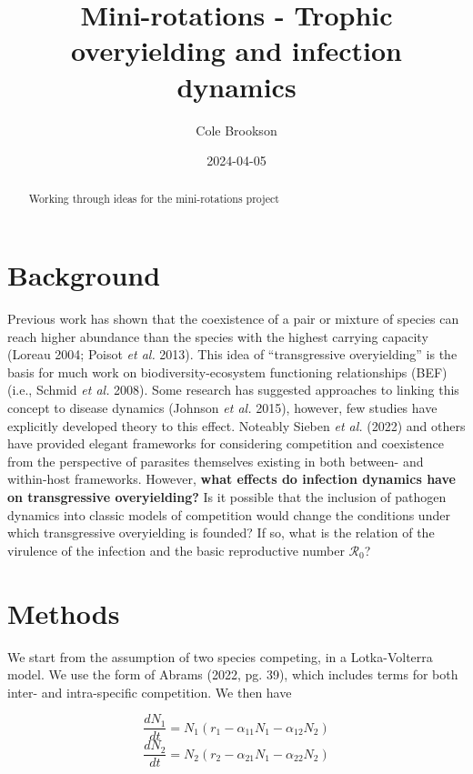 \documentclass[
  letterpaper,
  DIV=11,
  numbers=noendperiod]{scrartcl}
\title{Mini-rotations - Trophic overyielding and infection dynamics}
\author{Cole Brookson}
\date{2024-04-05}
\renewcommand*\contentsname{Table of contents}
\newcommand\contentsname{Table of contents}
\begin{document}
\maketitle
\begin{abstract}
Working through ideas for the mini-rotations project
\end{abstract}

\renewcommand*\contentsname{Table of contents}
{
\hypersetup{linkcolor=}
\setcounter{tocdepth}{3}
\tableofcontents
}
\section{Background}

Previous work has shown that the coexistence of a pair or mixture of
species can reach higher abundance than the species with the highest
carrying capacity (Loreau 2004; Poisot \emph{et al.} 2013). This idea of
``transgressive overyielding'' is the basis for much work on
biodiversity-ecosystem functioning relationships (BEF) (i.e., Schmid
\emph{et al.} 2008). Some research has suggested approaches to linking
this concept to disease dynamics (Johnson \emph{et al.} 2015), however,
few studies have explicitly developed theory to this effect. Noteably
Sieben \emph{et al.} (2022) and others have provided elegant frameworks
for considering competition and coexistence from the perspective of
parasites themselves existing in both between- and within-host
frameworks. However,
\textbf{what effects do infection dynamics have on transgressive overyielding?}
Is it possible that the inclusion of pathogen dynamics into classic
models of competition would change the conditions under which
transgressive overyielding is founded? If so, what is the relation of
the virulence of the infection and the basic reproductive number
\(\mathcal{R_0}\)?

\section{Methods}

We start from the assumption of two species competing, in a
Lotka-Volterra model. We use the form of Abrams (2022, pg. 39), which
includes terms for both inter- and intra-specific competition. We then
have

\begin{equation}
  \label{eqn:simple-lv-1}
  \frac{dN_1}{dt} = N_1(r_1 - \alpha_{11}N_1 - \alpha_{12}N_2)
\end{equation} \begin{equation}
  \label{eqn:simple-lv-2}
  \frac{dN_2}{dt} = N_2(r_2 - \alpha_{21}N_1 - \alpha_{22}N_2)
\end{equation}
\end{document}
